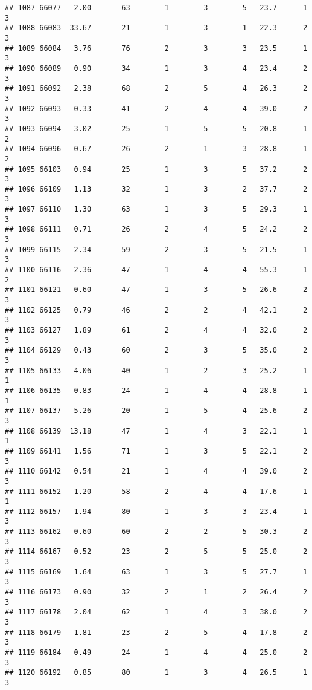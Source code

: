 \documentclass[
]{article}
\begin{document}
\begin{verbatim}
## 1087 66077   2.00       63        1        3        5   23.7      1      3
## 1088 66083  33.67       21        1        3        1   22.3      2      3
## 1089 66084   3.76       76        2        3        3   23.5      1      3
## 1090 66089   0.90       34        1        3        4   23.4      2      3
## 1091 66092   2.38       68        2        5        4   26.3      2      3
## 1092 66093   0.33       41        2        4        4   39.0      2      3
## 1093 66094   3.02       25        1        5        5   20.8      1      2
## 1094 66096   0.67       26        2        1        3   28.8      1      2
## 1095 66103   0.94       25        1        3        5   37.2      2      3
## 1096 66109   1.13       32        1        3        2   37.7      2      3
## 1097 66110   1.30       63        1        3        5   29.3      1      3
## 1098 66111   0.71       26        2        4        5   24.2      2      3
## 1099 66115   2.34       59        2        3        5   21.5      1      3
## 1100 66116   2.36       47        1        4        4   55.3      1      2
## 1101 66121   0.60       47        1        3        5   26.6      2      3
## 1102 66125   0.79       46        2        2        4   42.1      2      3
## 1103 66127   1.89       61        2        4        4   32.0      2      3
## 1104 66129   0.43       60        2        3        5   35.0      2      3
## 1105 66133   4.06       40        1        2        3   25.2      1      1
## 1106 66135   0.83       24        1        4        4   28.8      1      1
## 1107 66137   5.26       20        1        5        4   25.6      2      3
## 1108 66139  13.18       47        1        4        3   22.1      1      1
## 1109 66141   1.56       71        1        3        5   22.1      2      3
## 1110 66142   0.54       21        1        4        4   39.0      2      3
## 1111 66152   1.20       58        2        4        4   17.6      1      1
## 1112 66157   1.94       80        1        3        3   23.4      1      3
## 1113 66162   0.60       60        2        2        5   30.3      2      3
## 1114 66167   0.52       23        2        5        5   25.0      2      3
## 1115 66169   1.64       63        1        3        5   27.7      1      3
## 1116 66173   0.90       32        2        1        2   26.4      2      3
## 1117 66178   2.04       62        1        4        3   38.0      2      3
## 1118 66179   1.81       23        2        5        4   17.8      2      3
## 1119 66184   0.49       24        1        4        4   25.0      2      3
## 1120 66192   0.85       80        1        3        4   26.5      1      3

\end{verbatim}
\end{document}
